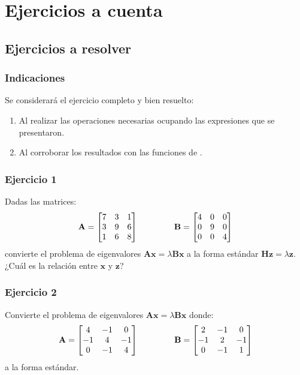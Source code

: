 \documentclass[12pt]{beamer}
\begin{document}
\section{Ejercicios a cuenta}
\subsection{Ejercicios a resolver}

\begin{frame}
\frametitle{Indicaciones}
Se considerará el ejercicio completo y bien resuelto:
\begin{enumerate}[<+->]
\item Al realizar las operaciones necesarias ocupando las expresiones que se presentaron.
\item Al corroborar los resultados con las funciones de \python.
\end{enumerate}
\end{frame}
\begin{frame}
\frametitle{Ejercicio 1}
Dadas las matrices:
\renewcommand{\arraystretch}{1}
\begin{align*}
\mathbf{A} = 
\begin{bmatrix}
7 & 3 & 1 \\
3 & 9 & 6 \\
1 & 6 & 8 \\
\end{bmatrix}
\hspace{1.5cm}
\mathbf{B} = 
\begin{bmatrix}
4 & 0 & 0 \\
0 & 9 & 0 \\
0 & 0 & 4 \\
\end{bmatrix}
\end{align*}
convierte el problema de eigenvalores $\mathbf{A x} = \lambda \mathbf{B x}$ a la forma estándar $\mathbf{H z} = \lambda \mathbf{z}$. ¿Cuál es la relación entre $\mathbf{x}$ y $\mathbf{z}$?
\end{frame}
\begin{frame}
\frametitle{Ejercicio 2}
Convierte el problema de eigenvalores $\mathbf{A x} = \lambda \mathbf{B x}$ donde:
\renewcommand{\arraystretch}{1}
\begin{align*}
\mathbf{A} = 
\begin{bmatrix}
4 & -1 & 0 \\
-1 & 4 & -1 \\
0 & -1 & 4 \\
\end{bmatrix}
\hspace{1.5cm}
\mathbf{B} = 
\begin{bmatrix}
2 & -1 & 0 \\
-1 & 2 & -1 \\
0 & -1 & 1 \\
\end{bmatrix}
\end{align*}
a la forma estándar.
\end{frame}
\end{document}
